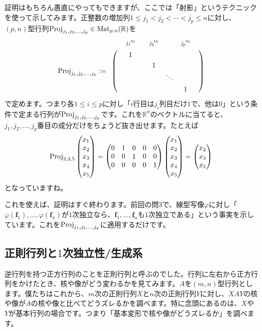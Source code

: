 証明はもちろん愚直にやってもできますが、ここでは「射影」というテクニックを使って示してみます。正整数の増加列$1\leq j_1 < j_2 < \cdots < j_p \leq n$に対し、$(p, n)$型行列$\operatorname{Proj}_{j_1, j_2, \ldots, j_p}\in\operatorname{Mat}_{p, n}(\mathbb{R})$を
\begin{align*}
\Proj_{j_1, j_2, \ldots, j_p} :=
\bordermatrix{
 & & \scalebox{0.8}{${j_1}^{\text{th}}$} &  & \scalebox{0.8}{${j_2}^{\text{th}}$} &  & \scalebox{0.8}{${j_p}^{\text{th}}$} \cr
 & & 1 &  &  \cr
 & &  &  & 1 \cr
 & & & & & \ddots \cr
 & & & & & & 1 &
}
\end{align*}
で定めます。つまり各$1\leq i \leq p$に対し「$i$行目は$j_i$列目だけ$1$で、他は$0$」という条件で定まる行列が$\operatorname{Proj}_{j_1, j_2, \ldots, j_p}$です。これを$\mathbb{R}^n$のベクトルに当てると、$j_1, j_2, \ldots, j_p$番目の成分だけをちょうど抜き出せます。たとえば
\[
\operatorname{Proj}_{2, 3, 5}
\begin{pmatrix}
x_1 \\
x_2 \\
x_3 \\
x_4 \\
x_5
\end{pmatrix}
=
\begin{pmatrix}
0 & 1 & 0 & 0 & 0 \\
0 & 0 & 1 & 0 & 0 \\
0 & 0 & 0 & 0 & 1
\end{pmatrix}
\begin{pmatrix}
x_1 \\
x_2 \\
x_3 \\
x_4 \\
x_5
\end{pmatrix}
=
\begin{pmatrix}
x_2 \\
x_3 \\
x_5
\end{pmatrix}
\]
となっていますね。

これを使えば、証明はすぐ終わります。前回の問$3$で、線型写像$\varphi$に対し「$\varphi(\bm{f}_1), \ldots, \varphi(\bm{f}_n)$が$1$次独立なら、$\bm{f}_1, \ldots, \bm{f}_n$も$1$次独立である」という事実を示しています。これを$\operatorname{Proj}_{j_1, j_2, \ldots, j_p}$に適用するだけです。

\subsection{正則行列と$1$次独立性/生成系}

逆行列を持つ正方行列のことを正則行列と呼ぶのでした。行列に左右から正方行列をかけたとき、核や像がどう変わるかを見てみます。$A$を$(m, n)$型行列とします。僕たちはこれから、$m$次の正則行列$X$と$n$次の正則行列$Y$に対し、$XAY$の核や像が$A$の核や像と比べてどうズレるかを調べます。特に念頭にあるのは、$X$や$Y$が基本行列の場合です。つまり「基本変形で核や像がどうズレるか」を調べます。

